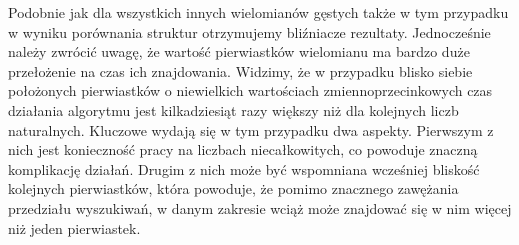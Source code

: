 Podobnie jak dla wszystkich innych wielomianów gęstych także w tym przypadku w wyniku porównania struktur otrzymujemy bliźniacze rezultaty. Jednocześnie należy zwrócić uwagę, że wartość pierwiastków wielomianu ma bardzo duże przełożenie na czas ich znajdowania. Widzimy, że w przypadku blisko siebie położonych pierwiastków o niewielkich wartościach zmiennoprzecinkowych czas działania algorytmu jest kilkadziesiąt razy większy niż dla kolejnych liczb naturalnych. Kluczowe wydają się w tym przypadku dwa aspekty. Pierwszym z nich jest konieczność pracy na liczbach niecałkowitych, co powoduje znaczną komplikację działań. Drugim z nich może być wspomniana wcześniej bliskość kolejnych pierwiastków, która powoduje, że pomimo znacznego zawężania przedziału wyszukiwań, w danym zakresie wciąż może znajdować się w nim więcej niż jeden pierwiastek.
